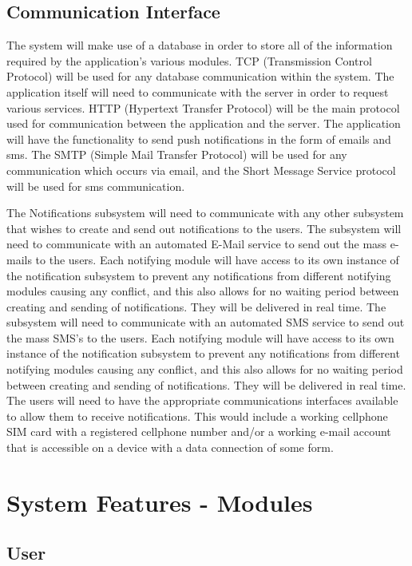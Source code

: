 \documentclass{article}
\begin{document}
\subsection{Communication Interface}

The system will make use of a database in order to store all of the information required by the application's various modules. TCP (Transmission Control Protocol) will be used for any database communication within the system. The application itself will need to communicate with the server in order to request various services. HTTP (Hypertext Transfer Protocol) will be the main protocol used for communication between the application and the server. The application will have the functionality to send push notifications in the form of emails and sms. The SMTP (Simple Mail Transfer Protocol) will be used for any communication which occurs via email, and the Short Message Service protocol will be used for sms communication.


The Notifications subsystem will need to communicate with any other subsystem that wishes to create and send out notifications to the users.
The subsystem will need to communicate with an automated E-Mail service to send out the mass e-mails to the users. Each notifying module will have access to its own instance of the notification subsystem to prevent any notifications from different notifying modules causing any conflict, and this also allows for no waiting period between creating and sending of notifications. They will be delivered in real time.
The subsystem will need to communicate with an automated SMS service to send out the mass SMS's to the users. Each notifying module will have access to its own instance of the notification subsystem to prevent any notifications from different notifying modules causing any conflict, and this also allows for no waiting period between creating and sending of notifications. They will be delivered in real time.
The users will need to have the appropriate communications interfaces available to allow them to receive notifications. This would include a working cellphone SIM card with a registered cellphone number and/or a working e-mail account that is accessible on a device with a data connection of some form.

\newpage
\section{System Features - Modules}

\subsection{User}
\end{document}
